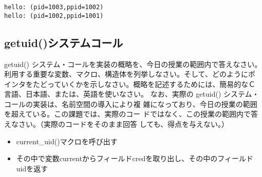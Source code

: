 \documentclass[a4j,9pt]{jsarticle}
\begin{document}
\begin{lstlisting}
hello: (pid=1003,ppid=1002)
hello: (pid=1002,ppid=1001)
\end{lstlisting}

\subsection{getuid()システムコール}

\begin{screen}
getuid() システム・コールを実装の概略を、今日の授業の範囲内で答えなさい。 利用する重要な変数、マクロ、構造体を列挙しなさい。そして、どのようにポ インタをたどっていくかを示しなさい。概略を記述するためには、簡易的なＣ 言語、日本語、または、英語を使いなさい。
なお、実際の getuid() システム・コールの実装は、名前空間の導入により複
 雑になっており、今日の授業の範囲を超えている。この課題では、実際のコー
 ドではなく、この授業の範囲内で答えなさい。（実際のコードをそのまま回答
 しても、得点を与えない。）
\end{screen}

\begin{itemize}
 \item  current\_uid()マクロを呼び出す
 \item その中で変数currentからフィールドcredを取り出し、その中のフィールドuidを返す
\end{itemize}
\end{document}
